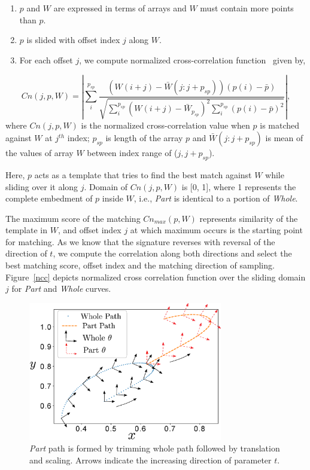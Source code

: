 \begin{enumerate}
  \item $p$ and $W$ are expressed in terms of arrays and $W$ must contain more points than $p$.
  \item $p$ is slided with offset index $j$ along $W$.
  \item For each offset $j$, we compute normalized cross-correlation function~\cite{lewis1995fast}  given by,
\end{enumerate}
\vspace{-0.6cm}
\begin{equation}\label{nccEq}
  Cn(j, p, W) = |\sum_{i}^{p_{sp}} \frac{(W(i+j) - \bar{W}(j : j + p_{sp}))(p(i) - \bar{p})}{\sqrt{\sum_{i}^{p_{sp}}{(W(i+j) - \bar{W}_{p_{sp}})}^2\sum_{i}^{p_{sp}}{(p(i) - \bar{p})}^2}} |,
\end{equation}
where $Cn(j, p, W)$ is the normalized cross-correlation value when $p$ is matched against $W$ at $j^{th}$ index; $p_{sp}$ is length of the array $p$ and $\bar{W}(j:j + p_{sp})$ is mean of the values of array $W$ between index range of ($j, j+p_{sp}$).

Here, $p$ acts as a template that tries to find the best match against $W$ while sliding over it along $j$.
Domain of $Cn(j, p, W)$ is [0, 1], where 1 represents the complete embedment of $p$ inside $W$, i.e., \emph{Part} is identical to a portion of \emph{Whole}.

The maximum score of the matching $Cn_{max}(p, W)$ represents similarity of the template in $W$, and offset index $j$ at which maximum occurs is the starting point for matching.
As we know that the signature reverses with reversal of the direction of $t$, we compute the correlation along both directions and select the best matching score, offset index and the matching direction of sampling.
Figure~\ref{ncc} depicts normalized cross correlation function over the sliding domain $j$ for \emph{Part} and \emph{Whole} curves.

\begin{figure}
\centering
\includegraphics[width=240pt]{jcise-18/figure/fig_whole_part.eps}
  \caption{\emph{Part} path is formed by trimming whole path followed by translation and scaling. Arrows indicate the increasing direction of parameter $t$.}
\label{wholePart}
\end{figure}

